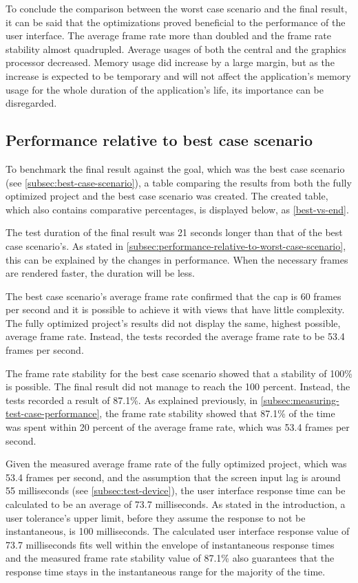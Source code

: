 \documentclass[a4paper,12pt]{article}
\begin{document}
To conclude the comparison between the worst case scenario and the final result, it can be said that the optimizations proved beneficial to the performance of the user interface. The average frame rate more than doubled and the frame rate stability almost quadrupled. Average usages of both the central and the graphics processor decreased. Memory usage did increase by a large margin, but as the increase is expected to be temporary and will not affect the application's memory usage for the whole duration of the application's life, its importance can be disregarded.

\subsection{Performance relative to best case scenario}
\label{subsec:performance-relative-to-best-case-scenario}
To benchmark the final result against the goal, which was the best case scenario (see \autoref{subsec:best-case-scenario}), a table comparing the results from both the fully optimized project and the best case scenario was created. The created table, which also contains comparative percentages, is displayed below, as \autoref{best-vs-end}.

The test duration of the final result was 21 seconds longer than that of the best case scenario's. As stated in \autoref{subsec:performance-relative-to-worst-case-scenario}, this can be explained by the changes in performance. When the necessary frames are rendered faster, the duration will be less.

The best case scenario's average frame rate confirmed that the cap is 60 frames per second and it is possible to achieve it with views that have little complexity. The fully optimized project's results did not display the same, highest possible, average frame rate. Instead, the tests recorded the average frame rate to be 53.4 frames per second.

The frame rate stability for the best case scenario showed that a stability of 100\% is possible. The final result did not manage to reach the 100 percent. Instead, the tests recorded a result of 87.1\%. As explained previously, in \autoref{subsec:measuring-test-case-performance}, the frame rate stability showed that 87.1\% of the time was spent within 20 percent of the average frame rate, which was 53.4 frames per second.

Given the measured average frame rate of the fully optimized project, which was 53.4 frames per second, and the assumption that the screen input lag is around 55 milliseconds (see \autoref{subsec:test-device}), the user interface response time can be calculated to be an average of 73.7 milliseconds. As stated in the introduction, a user tolerance's upper limit, before they assume the response to not be instantaneous, is 100 milliseconds. The calculated user interface response value of 73.7 milliseconds fits well within the envelope of instantaneous response times and the measured frame rate stability value of 87.1\% also guarantees that the response time stays in the instantaneous range for the majority of the time.
\end{document}
